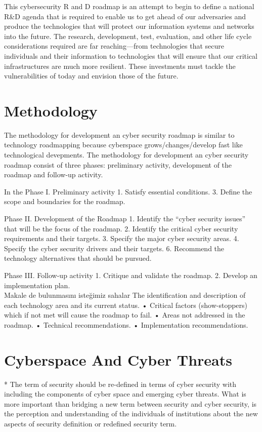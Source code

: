\documentclass[journal]{IEEEtran}
\begin{document}
This cybersecurity R and D roadmap  is an attempt to begin to define a national R\&D agenda that is required to enable us to get ahead of our adversaries and produce the technologies that will protect our information systems and networks into the future. The research, development, test, evaluation, and other life cycle considerations required are far reaching—from technologies that secure individuals and their information to technologies that will ensure that our critical infrastructures are much more resilient. These investments must tackle the vulnerabilities of today and envision those of the future.


\section{Methodology}
The methodology for development an cyber security roadmap  is similar to technology roadmapping because cyberspace grows/changes/develop fast like technological devepments. The methodology for development an cyber security roadmap consist of three phases: preliminary activity, development of the roadmap and follow-up activity.\cite{maughan2009roadmap} 

In the Phase I. Preliminary activity
1. Satisfy essential conditions.
3. Define the scope and boundaries for the roadmap.

Phase II. Development of the Roadmap
1. Identify the “cyber security issues” that will be the focus of the roadmap.
2. Identify the critical cyber security requirements and their targets.
3. Specify the major cyber security areas.
4. Specify the cyber security drivers and their targets.
6. Recommend the technology alternatives that should be pursued.

Phase III. Follow-up activity
1. Critique and validate the roadmap.
2. Develop an implementation plan.
\\

	
	Makale de bulunmasını isteğimiz sahalar
	The identification and description of each technology area and its current status.
	• Critical factors (show-stoppers) which if not met will cause the roadmap to fail.
	• Areas not addressed in the roadmap.
	• Technical recommendations.
	• Implementation recommendations.

\section{Cyberspace And Cyber Threats }
* The term of security should be re-defined in terms of cyber security with including the components of cyber space and emerging cyber threats. What is more important  than bridging a new term between security and cyber security, is the perception and understanding of the individuals of  institutions about the new aspects of security definition or redefined security term.
\end{document}
